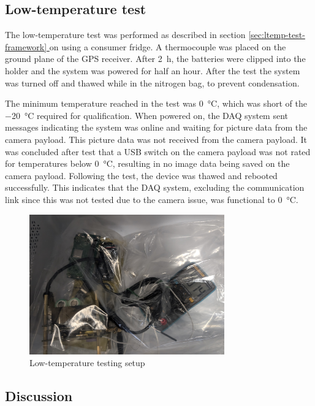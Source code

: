 \documentclass[]{report}
\newcommand*{\secref}[1]{section \hyperref[{#1}]{\ref*{#1} \nameref*{#1}}}
\begin{document}
\subsection{Low-temperature test}
The low-temperature test was performed as described in \secref{sec:ltemp-test-framework} on  using a consumer fridge. A thermocouple was placed on the ground plane of the GPS receiver. After \SI{2}{\hour}, the batteries were clipped into the holder and the system was powered for half an hour. After the test the system was turned off and thawed while in the nitrogen bag, to prevent condensation.

The minimum temperature reached in the test was \SI{0}{\degreeCelsius}, which was short of the \SI{-20}{\degreeCelsius} required for qualification. When powered on, the DAQ system sent messages indicating the system was online and waiting for picture data from the camera payload. This picture data was not received from the camera payload. It was concluded after test that a USB switch on the camera payload was not rated for temperatures below \SI{0}{\degreeCelsius}, resulting in no image data being saved on the camera payload. Following the test, the device was thawed and rebooted successfully. This indicates that the DAQ system, excluding the communication link since this was not tested due to the camera issue, was functional to \SI{0}{\degreeCelsius}.

\begin{figure}[H]
  \centering
  \includegraphics[width=0.75\textwidth]{images/fridge_test.jpg}
  \caption{Low-temperature testing setup}
  \label{fig:temperature-testing-fridge}
\end{figure}

\subsection{Discussion}
\end{document}
